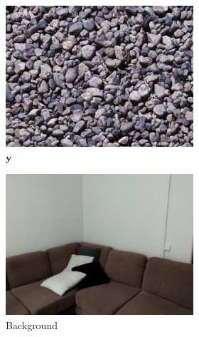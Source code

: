 \begin{figure}[]
\begin{subfigure}{\textwidth}
        \begin{subfigure}{0.24\textwidth}
            \centering
            \includegraphics[width=\textwidth]{images/04-experiment02/sofa/pebbles/target.jpg}
            \caption*{\(\bm{y}\)}
        \end{subfigure}
        \hfill
        \begin{subfigure}{0.24\textwidth}
            \centering
            \includegraphics[width=\textwidth]{images/04-experiment02/sofa/bg.jpg}
            \caption*{Background}
        \end{subfigure}
        \hfill
        \begin{subfigure}{0.24\textwidth}
            \centering
            \begin{tikzpicture}

\end{tikzpicture}
\end{subfigure}
\end{subfigure}
\end{figure}
